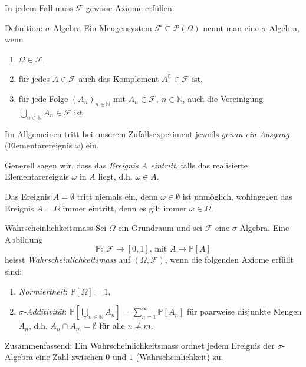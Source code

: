 \documentclass[a4paper,10pt]{article}
\def\N{\mathbb{N}}
\def\P{\mathbb{P}}
\begin{document}
In jedem Fall muss \( \mathcal{F} \) gewisse Axiome erfüllen:

\begin{mainbox}{Definition: \( \sigma \)-Algebra}
    Ein Mengensystem \( \mathcal{F} \subseteq \mathcal{P}(\Omega) \) nennt man eine \( \sigma \)-Algebra, wenn
    \begin{enumerate}
        \item \( \Omega \in \mathcal{F} \),
        \item für jedes \( A \in \mathcal{F} \) auch das Komplement \( A^\complement \in \mathcal{F} \) ist,
        \item für jede Folge \( \left( A_n \right)_{n \in \N} \) mit \( A_n \in \mathcal{F}, \ n \in \N \), auch die Vereinigung \( \bigcup_{n \in \N} A_n \in \mathcal{F} \) ist.
    \end{enumerate}
\end{mainbox}

Im Allgemeinen tritt bei unserem Zufallsexperiment jeweils \emph{genau ein Ausgang} (Elementarereignis \( \omega \)) ein.

Generell sagen wir, dass das \emph{Ereignis A eintritt}, falls das realisierte Elementarereignis \( \omega \) in \( A \) liegt, d.h. \( \omega \in A \).

Das Ereignis \( A = \emptyset \) tritt niemals ein, denn \( \omega \in \emptyset \) ist unmöglich, wohingegen das Ereignis \( A = \Omega \) immer eintritt, denn es gilt immer \( \omega \in \Omega \).

\begin{mainbox}{Wahrscheinlichkeitsmass}
    Sei \( \Omega \) ein Grundraum und sei \( \mathcal{F} \) eine \( \sigma \)-Algebra. Eine Abbildung \[ \P: \: \mathcal{F} \to [0, 1], \, \text{mit } A \mapsto \P[A] \] heisst \emph{Wahrscheinlichkeitsmass} auf \( (\Omega, \mathcal{F}) \), wenn die folgenden Axiome erfüllt sind:
    \begin{enumerate}
        \item \emph{Normiertheit}: \( \P[\Omega] = 1 \),
        \item \emph{\( \sigma \)-Additivität}: \( \P \left[ \bigcup_{n \in \N} A_n \right] = \sum_{n = 1}^\infty \P \left[ A_n \right] \) für paarweise disjunkte Mengen \( A_n \), d.h. \( A_n \cap A_m = \emptyset \) für alle \( n \neq m \).
    \end{enumerate}

    Zusammenfassend: Ein Wahrscheinlichkeitsmass ordnet jedem Ereignis der \( \sigma \)-Algebra eine Zahl zwischen \( 0 \) und \( 1 \) (Wahrscheinlichkeit) zu.
\end{mainbox}
\end{document}
